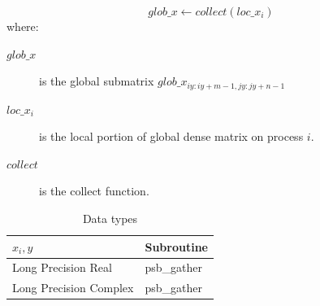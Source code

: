 \[ glob\_x \leftarrow collect(loc\_x_i) \]
where:
\begin{description}
\item[$glob\_x$] is the global submatrix $glob\_x_{iy:iy+m-1,jy:jy+n-1}$
\item[$loc\_x_i$] is the local portion of global dense matrix on
process $i$.
\item[$collect$] is the collect function.
\end{description}

\begin{table}[h]
\begin{center}
\begin{tabular}{ll}
\hline
$x_i, y$ & {\bf Subroutine}\\
\hline
Long Precision Real & psb\_gather \\
Long Precision Complex & psb\_gather \\
\hline
\end{tabular}
\end{center}
\caption{Data types\label{tab:gather}}
\end{table}


